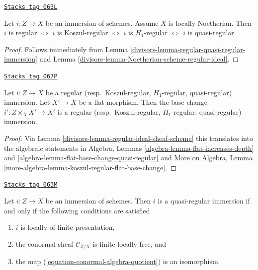 \begin{lemma}
\label{divisors-lemma-regular-immersion-noetherian}
\href{https://stacks.math.columbia.edu/tag/063L}{\texttt{Stacks tag 063L}}

Let $i : Z \to X$ be an immersion of schemes.
Assume $X$ is locally Noetherian. Then
$i$ is regular $\Leftrightarrow$
$i$ is Koszul-regular $\Leftrightarrow$
$i$ is $H_1$-regular $\Leftrightarrow$
$i$ is quasi-regular.
\end{lemma}

\begin{proof}

Follows immediately from
Lemma \ref{divisors-lemma-regular-quasi-regular-immersion}
and
Lemma \ref{divisors-lemma-Noetherian-scheme-regular-ideal}.
\end{proof}

\begin{lemma}
\label{divisors-lemma-flat-base-change-regular-immersion}
\href{https://stacks.math.columbia.edu/tag/067P}{\texttt{Stacks tag 067P}}

Let $i : Z \to X$ be a regular (resp.\ Koszul-regular,
$H_1$-regular, quasi-regular) immersion. Let $X' \to X$ be a flat
morphism. Then the base change $i' : Z \times_X X' \to X'$
is a regular (resp.\ Koszul-regular,
$H_1$-regular, quasi-regular) immersion.
\end{lemma}

\begin{proof}

Via
Lemma \ref{divisors-lemma-regular-ideal-sheaf-scheme}
this translates into the algebraic statements in
Algebra, Lemmas \ref{algebra-lemma-flat-increases-depth} and
\ref{algebra-lemma-flat-base-change-quasi-regular}
and
More on Algebra,
Lemma \ref{more-algebra-lemma-koszul-regular-flat-base-change}.
\end{proof}

\begin{lemma}
\label{divisors-lemma-quasi-regular-immersion}
\href{https://stacks.math.columbia.edu/tag/063M}{\texttt{Stacks tag 063M}}

Let $i : Z \to X$ be an immersion of schemes. Then $i$ is a quasi-regular
immersion if and only if the following conditions are satisfied
\begin{enumerate}
\item $i$ is locally of finite presentation,
\item the conormal sheaf $\mathcal{C}_{Z/X}$ is finite locally free, and
\item the map (\ref{equation-conormal-algebra-quotient}) is an isomorphism.
\end{enumerate}
\end{lemma}

